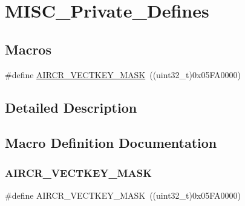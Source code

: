 \hypertarget{group___m_i_s_c___private___defines}{}\section{M\+I\+S\+C\+\_\+\+Private\+\_\+\+Defines}
\label{group___m_i_s_c___private___defines}
\subsection*{Macros}
\begin{DoxyCompactItemize}
\item 
\#define \mbox{\hyperlink{group___m_i_s_c___private___defines_gad6905141fba3a2d8d5570db40805dc6a}{A\+I\+R\+C\+R\+\_\+\+V\+E\+C\+T\+K\+E\+Y\+\_\+\+M\+A\+SK}}~((uint32\+\_\+t)0x05\+F\+A0000)
\end{DoxyCompactItemize}


\subsection{Detailed Description}


\subsection{Macro Definition Documentation}
\mbox{\label{group___m_i_s_c___private___defines_gad6905141fba3a2d8d5570db40805dc6a}} 
\subsubsection{\texorpdfstring{AIRCR\_VECTKEY\_MASK}{AIRCR\_VECTKEY\_MASK}}
{\footnotesize\ttfamily \#define A\+I\+R\+C\+R\+\_\+\+V\+E\+C\+T\+K\+E\+Y\+\_\+\+M\+A\+SK~((uint32\+\_\+t)0x05\+F\+A0000)}

